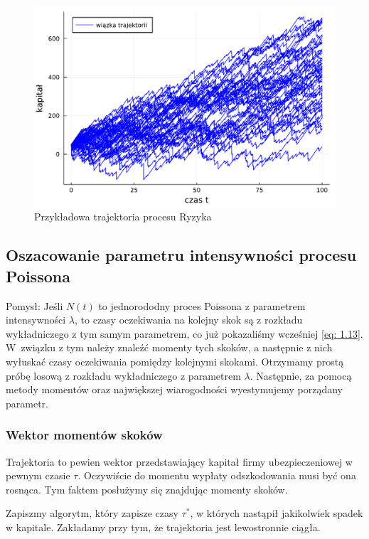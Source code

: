 \documentclass{article}
\theoremstyle{break}
\numberwithin{equation}{subsection}
\numberwithin{figure}{section}
\begin{document}
\begin{figure}[H]
	\center
	\includegraphics[scale=0.35]{wizualizacja_trajektorii.pdf}
	\caption{Przykładowa trajektoria procesu Ryzyka}
	\label{fig: wizualizacja}
\end{figure}

\subsection{Oszacowanie parametru intensywności procesu Poissona}

Pomysł: Jeśli $N(t)$ to jednorododny proces Poissona z parametrem intensywności $\lambda$, to czasy oczekiwania na kolejny skok są z rozkładu wykładniczego z tym samym parametrem, co już pokazaliśmy wcześniej \eqref{eq: 1.13}. W~związku z tym należy znaleźć momenty tych skoków, a następnie z nich wyłuskać czasy oczekiwania pomiędzy kolejnymi skokami. Otrzymamy prostą próbę losową z rozkładu wykładniczego z parametrem $\lambda$.
Następnie, za pomocą metody momentów oraz największej wiarogodności wyestymujemy porządany parametr.

\subsubsection*{Wektor momentów skoków}

Trajektoria to pewien wektor przedstawiający kapitał firmy ubezpieczeniowej w pewnym czasie $\tau$. Oczywiście do momentu wypłaty odszkodowania musi być ona rosnąca. Tym faktem posłużymy się znajdując momenty skoków.

Zapiszmy algorytm, który zapisze czasy $\tau^*$, w których nastąpił jakikolwiek spadek w kapitale. Zakładamy przy tym, że trajektoria jest lewostronnie ciągła.
\end{document}
